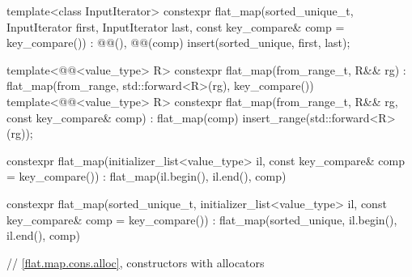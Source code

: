\begin{codeblock}
{{    template<class InputIterator>
      constexpr flat_map(sorted_unique_t, InputIterator first, InputIterator last,
                         const key_compare& comp = key_compare())
        : @@(), @@(comp) { insert(sorted_unique, first, last); }

    template<@@<value_type> R>
      constexpr flat_map(from_range_t, R&& rg)
        : flat_map(from_range, std::forward<R>(rg), key_compare()) { }
    template<@@<value_type> R>
      constexpr flat_map(from_range_t, R&& rg, const key_compare& comp)
        : flat_map(comp) { insert_range(std::forward<R>(rg)); }

    constexpr flat_map(initializer_list<value_type> il, const key_compare& comp = key_compare())
        : flat_map(il.begin(), il.end(), comp) { }

    constexpr flat_map(sorted_unique_t, initializer_list<value_type> il,
                       const key_compare& comp = key_compare())
        : flat_map(sorted_unique, il.begin(), il.end(), comp) { }

    // \ref{flat.map.cons.alloc}, constructors with allocators

}}
\end{codeblock}
